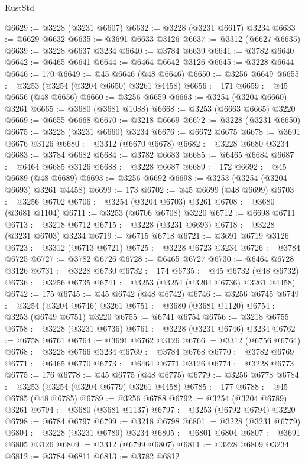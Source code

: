 \begin{lexlean}{RustStd}
\begin{coremodule}
@6629 := @3228 (@3231 @6607)
@6632 := @3228 (@3231 @6617) @3234
@6633 := @6629 @6632
@6635 := @3691 @6633 @3126
@6637 := @3312 (@6627 @6635)
@6639 := @3228 @6637 @3234
@6640 := @3784 @6639
@6641 := @3782 @6640
@6642 := @6465 @6641
@6644 := @6464 @6642 @3126
@6645 := @3228 @6644
@6646 := 170
@6649 := @45 @6646 (@48 @6646)
@6650 := @3256 @6649
@6655 := @3253 (@3254 (@3204 @6650) @3261 @4458)
@6656 := 171
@6659 := @45 @6656 (@48 @6656)
@6660 := @3256 @6659
@6663 := @3254 (@3204 @6660) @3261
@6665 := @3680 (@3681 @1088)
@6668 := @3253 (@6663 @6665) @3220
@6669 := @6655 @6668
@6670 := @3218 @6669
@6672 := @3228 (@3231 @6650)
@6675 := @3228 (@3231 @6660) @3234
@6676 := @6672 @6675
@6678 := @3691 @6676 @3126
@6680 := @3312 (@6670 @6678)
@6682 := @3228 @6680 @3234
@6683 := @3784 @6682
@6684 := @3782 @6683
@6685 := @6465 @6684
@6687 := @6464 @6685 @3126
@6688 := @3228 @6687
@6689 := 172
@6692 := @45 @6689 (@48 @6689)
@6693 := @3256 @6692
@6698 := @3253 (@3254 (@3204 @6693) @3261 @4458)
@6699 := 173
@6702 := @45 @6699 (@48 @6699)
@6703 := @3256 @6702
@6706 := @3254 (@3204 @6703) @3261
@6708 := @3680 (@3681 @1104)
@6711 := @3253 (@6706 @6708) @3220
@6712 := @6698 @6711
@6713 := @3218 @6712
@6715 := @3228 (@3231 @6693)
@6718 := @3228 (@3231 @6703) @3234
@6719 := @6715 @6718
@6721 := @3691 @6719 @3126
@6723 := @3312 (@6713 @6721)
@6725 := @3228 @6723 @3234
@6726 := @3784 @6725
@6727 := @3782 @6726
@6728 := @6465 @6727
@6730 := @6464 @6728 @3126
@6731 := @3228 @6730
@6732 := 174
@6735 := @45 @6732 (@48 @6732)
@6736 := @3256 @6735
@6741 := @3253 (@3254 (@3204 @6736) @3261 @4458)
@6742 := 175
@6745 := @45 @6742 (@48 @6742)
@6746 := @3256 @6745
@6749 := @3254 (@3204 @6746) @3261
@6751 := @3680 (@3681 @1120)
@6754 := @3253 (@6749 @6751) @3220
@6755 := @6741 @6754
@6756 := @3218 @6755
@6758 := @3228 (@3231 @6736)
@6761 := @3228 (@3231 @6746) @3234
@6762 := @6758 @6761
@6764 := @3691 @6762 @3126
@6766 := @3312 (@6756 @6764)
@6768 := @3228 @6766 @3234
@6769 := @3784 @6768
@6770 := @3782 @6769
@6771 := @6465 @6770
@6773 := @6464 @6771 @3126
@6774 := @3228 @6773
@6775 := 176
@6778 := @45 @6775 (@48 @6775)
@6779 := @3256 @6778
@6784 := @3253 (@3254 (@3204 @6779) @3261 @4458)
@6785 := 177
@6788 := @45 @6785 (@48 @6785)
@6789 := @3256 @6788
@6792 := @3254 (@3204 @6789) @3261
@6794 := @3680 (@3681 @1137)
@6797 := @3253 (@6792 @6794) @3220
@6798 := @6784 @6797
@6799 := @3218 @6798
@6801 := @3228 (@3231 @6779)
@6804 := @3228 (@3231 @6789) @3234
@6805 := @6801 @6804
@6807 := @3691 @6805 @3126
@6809 := @3312 (@6799 @6807)
@6811 := @3228 @6809 @3234
@6812 := @3784 @6811
@6813 := @3782 @6812

\end{coremodule}
\end{lexlean}
